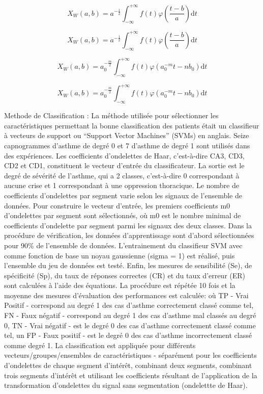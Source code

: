 \documentclass[12pt,]{article}
\begin{document}
\[X_{W}(a,b)=a^{-\frac{1}{2}}\int_{-\infty}^{+\infty} f(t)\varphi(\frac{t-b}{a}) \mathrm{d}t\]

\begin{equation}
    X_{W}(a,b)=a^{-\frac{1}{2}}\int_{-\infty}^{+\infty} f(t)\varphi(\frac{t-b}{a}) \mathrm{d}t
\label{WDT}
\end{equation}

\[X_{W}(a,b)=a_{0}^{-\frac{m}{2}}\int_{-\infty}^{+\infty} f(t)\varphi(a_{0}^{-m}t-nb_{0}) \mathrm{d}t\]

\begin{equation}
    X_{W}(a,b)=a_{0}^{-\frac{m}{2}}\int_{-\infty}^{+\infty} f(t)\varphi(a_{0}^{-m}t-nb_{0}) \mathrm{d}t
\label{WDT_pente}
\end{equation}

Methode de Classification : La méthode utilisée pour sélectionner les
caractéristiques permettant la bonne classification des patients était
un classifieur à vecteurs de support ou ``Support Vector Machines''
(SVMs) en anglais. Seize capnogrammes d'asthme de degré 0 et 7 d'asthme
de degré 1 sont utilisés dans des expériences. Les coefficients
d'ondelettes de Haar, c'est-à-dire CA3, CD3, CD2 et CD1, constituent le
vecteur d'entrée du classificateur. La sortie est le degré de sévérité
de l'asthme, qui a 2 classes, c'est-à-dire 0 correspondant à aucune
crise et 1 correspondant à une oppression thoracique. Le nombre de
coefficients d'ondelettes par segment varie selon les signaux de
l'ensemble de données. Pour construire le vecteur d'entrée, les premiers
coefficients m0 d'ondelettes par segment sont sélectionnés, où m0 est le
nombre minimal de coefficients d'ondelette par segment parmi les signaux
des deux classes. Dans la procédure de vérification, les données
d'apprentissage sont d'abord sélectionnées pour 90\% de l'ensemble de
données. L'entrainement du classifieur SVM avec comme fonction de base
un noyau gaussienne (sigma = 1) est réalisé, puis l'ensemble du jeu de
données est testé. Enfin, les mesures de sensibilité (Se), de
spécificité (Sp), du taux de réponses correctes (CR) et du taux d'erreur
(ER) sont calculées à l'aide des équations. La procédure est répétée 10
fois et la moyenne des mesures d'évaluation des performances est
calculée: où TP - Vrai Positif - correspond au degré 1 des cas d'asthme
correctement classé comme tel, FN - Faux négatif - correspond au degré 1
des cas d'asthme mal classés au degré 0, TN - Vrai négatif - est le
degré 0 des cas d'asthme correctement classé comme tel, un FP - Faux
positif - est le degré 0 des cas d'asthme incorrectement classé comme
degré 1. La classification est appliquée pour différents
vecteurs/groupes/ensembles de caractéristiques - séparément pour les
coefficients d'ondelettes de chaque segment d'intérêt, combinant deux
segments, combinant trois segments d'intérêt et utilisant les
coefficients résultant de l'application de la transformation
d'ondelettes du signal sans segmentation (ondelettte de Haar).
\end{document}

